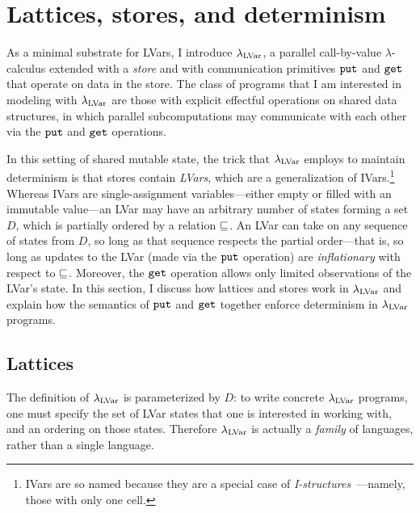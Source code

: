 \section{Lattices, stores, and determinism}\label{s:lvars-lattices}

As a minimal substrate for LVars, I introduce $\lambda_{\textrm{LVar}}$, a
 parallel call-by-value $\lambda$-calculus extended with
 a \emph{store} and with communication primitives $\mbox{\texttt{put}}$ and $\mbox{\texttt{get}}$
 that operate on data in the store.  The class of programs that I am
 interested in modeling with $\lambda_{\textrm{LVar}}$ are those with explicit
 effectful operations on shared data structures, in which parallel
 subcomputations may communicate with each other via the $\mbox{\texttt{put}}$ and
 $\mbox{\texttt{get}}$ operations.

In this setting of shared mutable state, the trick that $\lambda_{\textrm{LVar}}$
employs to maintain determinism is that stores contain \emph{LVars},
which are a generalization of IVars.\footnote{IVars are so named
because they are a special case
of \emph{I-structures}~\cite{IStructures}---namely, those with only
one cell.}  Whereas IVars are single-assignment variables---either
empty or filled with an immutable value---an LVar may have an
arbitrary number of states forming a set $D$, which is partially
ordered by a relation $\sqsubseteq$.  An LVar can take on any sequence of
states from $D$, so long as that sequence respects the partial
order---that is, so long as updates to the LVar (made via the $\mbox{\texttt{put}}$
operation) are \emph{inflationary} with respect to $\sqsubseteq$.
Moreover, the $\mbox{\texttt{get}}$ operation allows only limited observations of the
LVar's state.  In this section, I discuss how lattices and stores work
in $\lambda_{\textrm{LVar}}$ and explain how the semantics of $\mbox{\texttt{put}}$ and $\mbox{\texttt{get}}$
together enforce determinism in $\lambda_{\textrm{LVar}}$ programs.

\subsection{Lattices}\label{subsection:domains}

The definition of $\lambda_{\textrm{LVar}}$ is parameterized by $D$: to write
concrete $\lambda_{\textrm{LVar}}$ programs, one must specify the set of LVar
states that one is interested in working with, and an ordering on
those states.  Therefore $\lambda_{\textrm{LVar}}$ is actually a \emph{family} of
languages, rather than a single language.

